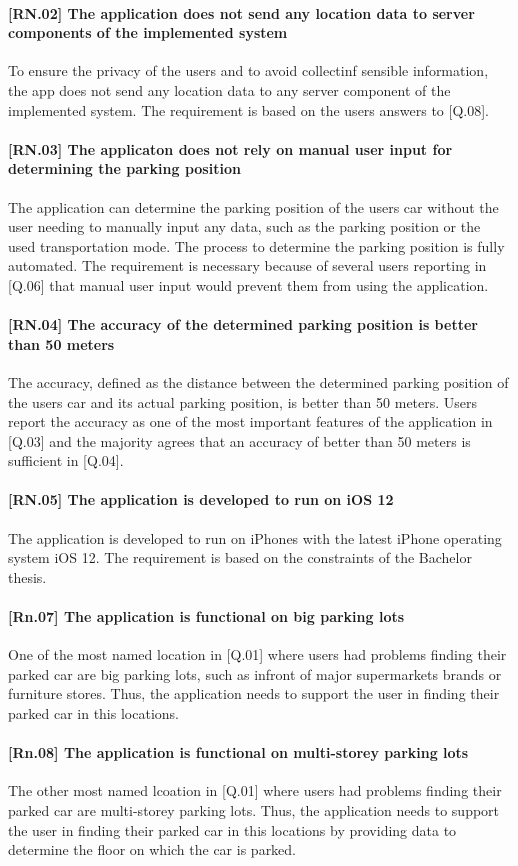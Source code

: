 \paragraph{[RN.02] The application does not send any location data to server components of the implemented system}
To ensure the privacy of the users and to avoid collectinf sensible information, the app does not send any location data to any server component of the implemented system. The requirement is based on the users answers to [Q.08].

\paragraph{[RN.03] The applicaton does not rely on manual user input for determining the parking position}
The application can determine the parking position of the users car without the user needing to manually input any data, such as the parking position or the used transportation mode. The process to determine the parking position is fully automated. The requirement is necessary because of several users reporting in [Q.06] that manual user input would prevent them from using the application.

\paragraph{[RN.04] The accuracy of the determined parking position is better than 50 meters}
The accuracy, defined as the distance between the determined parking position of the users car and its actual parking position, is better than 50 meters. Users report the accuracy as one of the most important features of the application in [Q.03] and the majority agrees that an accuracy of better than 50 meters is sufficient in [Q.04]. 

\paragraph{[RN.05] The application is developed to run on iOS 12}
The application is developed to run on iPhones with the latest iPhone operating system iOS 12. The requirement is based on the constraints of the Bachelor thesis. 

\paragraph{[Rn.07] The application is functional on big parking lots}
One of the most named location in [Q.01] where users had problems finding their parked car are big parking lots, such as infront of major supermarkets brands or furniture stores. Thus, the application needs to support the user in finding their parked car in this locations.

\paragraph{[Rn.08] The application is functional on multi-storey parking lots}
The other most named lcoation in [Q.01] where users had problems finding their parked car are multi-storey parking lots. Thus, the application needs to support the user in finding their parked car in this locations by providing data to determine the floor on which the car is parked. 